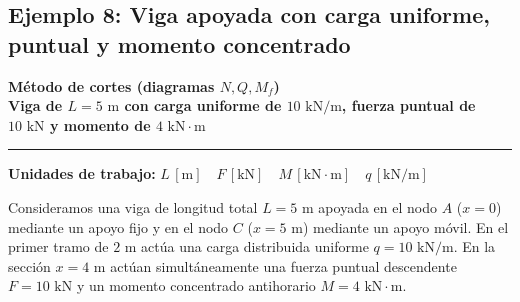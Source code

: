 \subsection{Ejemplo 8: Viga apoyada con carga uniforme, puntual y momento concentrado}

\begin{tcolorbox}[colback=blue!3!white, colframe=blue!40!black, arc=3pt, boxrule=0.8pt, left=8pt, right=8pt, top=6pt, bottom=6pt]
    \centering
    {\Large\bfseries\color{blue!60!black} Método de cortes (diagramas $N, Q, M_f$)}\\[2pt]
    {\normalsize\bfseries Viga de $L = 5\text{ m}$ con carga uniforme de $10\text{ kN/m}$, fuerza puntual de $10\text{ kN}$ y momento de $4\text{ kN}\cdot\text{m}$}

    \vspace{4pt}\hrule\vspace{4pt}
    {\small\textbf{Unidades de trabajo:} $L\,[\text{m}] \quad F\,[\text{kN}] \quad M\,[\text{kN}\cdot\text{m}] \quad q\,[\text{kN/m}]$}
\end{tcolorbox}


Consideramos una viga de longitud total $L = 5\text{ m}$ apoyada en el nodo $A$ ($x=0$) mediante un apoyo fijo y en el nodo $C$ ($x=5\text{ m}$) mediante un apoyo móvil. En el primer tramo de $2\text{ m}$ actúa una carga distribuida uniforme $q = 10\text{ kN/m}$. En la sección $x = 4\text{ m}$ actúan simultáneamente una fuerza puntual descendente $F = 10\text{ kN}$ y un momento concentrado antihorario $M = 4\text{ kN}\cdot\text{m}$.

